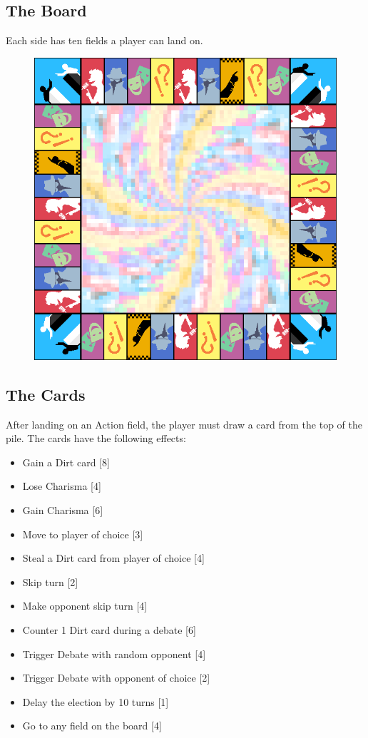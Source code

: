 \documentclass[a4paper,11pt]{amsart}
\begin{document}
\subsection{The Board}
Each side has ten fields a player can land on. 
\begin{figure}[H]
\includegraphics[width=\textwidth]{board}
\end{figure}
\subsection{The Cards}
After landing on an Action field, the player must draw a card from the top of the pile. The cards have the following effects: 
\begin{itemize}
\item Gain a Dirt card [8]
\item Lose Charisma [4]
\item Gain Charisma [6]
\item Move to player of choice [3]
\item Steal a Dirt card from player of choice [4]
\item Skip turn [2]
\item Make opponent skip turn [4]
\item Counter 1 Dirt card during a debate [6]
\item Trigger Debate with random opponent [4]
\item Trigger Debate with opponent of choice [2]
\item Delay the election by 10 turns [1]
\item Go to any field on the board [4]
\end{itemize} 
\end{document}
